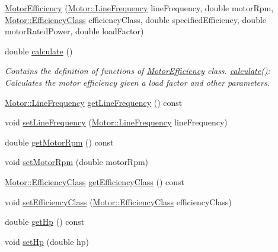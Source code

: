 \begin{DoxyCompactItemize}
\item 
\hyperlink{class_motor_efficiency_ab8d410693e778a2cb2d5a112cc1a4202}{Motor\+Efficiency} (\hyperlink{class_motor_acee1bdf1b684ad36cb80dc2829d9fcee}{Motor\+::\+Line\+Frequency} line\+Frequency, double motor\+Rpm, \hyperlink{class_motor_afa022971ae062406a9f588c601673d4e}{Motor\+::\+Efficiency\+Class} efficiency\+Class, double specified\+Efficiency, double motor\+Rated\+Power, double load\+Factor)
\item 
double \hyperlink{class_motor_efficiency_a448092c19177f5fff0c011f0c9398db0}{calculate} ()
\begin{DoxyCompactList}\small\item\em Contains the definition of functions of \hyperlink{class_motor_efficiency}{Motor\+Efficiency} class. \hyperlink{class_motor_efficiency_a448092c19177f5fff0c011f0c9398db0}{calculate()}\+: Calculates the motor efficiency given a load factor and other parameters. \end{DoxyCompactList}\item 
\hyperlink{class_motor_acee1bdf1b684ad36cb80dc2829d9fcee}{Motor\+::\+Line\+Frequency} \hyperlink{class_motor_efficiency_a3cc0ed606154a04d035399e05d1cb02a}{get\+Line\+Frequency} () const
\item 
void \hyperlink{class_motor_efficiency_a993b09941d330d3a46e0d72bd6dc65bb}{set\+Line\+Frequency} (\hyperlink{class_motor_acee1bdf1b684ad36cb80dc2829d9fcee}{Motor\+::\+Line\+Frequency} line\+Frequency)
\item 
double \hyperlink{class_motor_efficiency_ab29655f487e90a73246be6e9bc67c36a}{get\+Motor\+Rpm} () const
\item 
void \hyperlink{class_motor_efficiency_a2c4ddf9f2f3e44c098dad91a0ddbaf21}{set\+Motor\+Rpm} (double motor\+Rpm)
\item 
\hyperlink{class_motor_afa022971ae062406a9f588c601673d4e}{Motor\+::\+Efficiency\+Class} \hyperlink{class_motor_efficiency_a9eb7d5c2fc598f655c1a3d12790e4d17}{get\+Efficiency\+Class} () const
\item 
void \hyperlink{class_motor_efficiency_a1ff4790d01bf2e65bd7bce2edc98d0c5}{set\+Efficiency\+Class} (\hyperlink{class_motor_afa022971ae062406a9f588c601673d4e}{Motor\+::\+Efficiency\+Class} efficiency\+Class)
\item 
double \hyperlink{class_motor_efficiency_a9f88159c82daa270975d7969debe88a9}{get\+Hp} () const
\item 
void \hyperlink{class_motor_efficiency_a4b86113447665413ddbae115199d9b3f}{set\+Hp} (double hp)

\end{DoxyCompactItemize}
